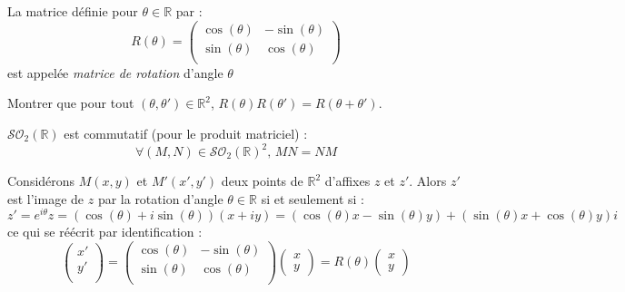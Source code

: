 \documentclass[french,11pt,twoside]{VcCours}
\begin{document}
\newpage

\begin{Notation}{} La matrice définie pour $\theta \in \mathbb{R}$ par :
$$ R(\theta) =\begin{pmatrix}
\cos(\theta) & - \sin(\theta) \\
\sin(\theta) & \cos(\theta) \\
\end{pmatrix}$$
est appelée \emph{matrice de rotation} d'angle $\theta$
\end{Notation}

\begin{ApplicationDirecte}{} Montrer que pour tout $(\theta, \theta') \in \mathbb{R}^2$, $R(\theta) R(\theta') = R(\theta + \theta')$.
\end{ApplicationDirecte}

\begin{Proposition}{} $\mathcal{SO}_2(\mathbb{R})$ est commutatif (pour le produit matriciel) : 
$$ \forall (M,N) \in \mathcal{SO}_2(\mathbb{R})^2, \,  MN=NM$$
\end{Proposition}

\begin{Demonstration}{}
\vspace{3cm}
\end{Demonstration}

\begin{Remarque}{} Considérons $M(x,y)$ et $M'(x',y')$ deux points de $\mathbb{R}^2$ d'affixes $z$ et $z'$. Alors $z'$ est l'image de $z$ par la rotation d'angle $\theta \in \mathbb{R}$ si et seulement si :
$$z'= e^{i \theta } z = (\cos(\theta) + i \sin(\theta))(x+iy) = (\cos(\theta) x- \sin(\theta)y) + (\sin(\theta)x+ \cos(\theta)y)i$$
ce qui se réécrit par identification :
$$ \begin{pmatrix}
x'\\
y' \\
\end{pmatrix} = \begin{pmatrix}
\cos(\theta) & - \sin(\theta) \\
\sin(\theta) & \cos(\theta) \\
\end{pmatrix} \begin{pmatrix}
x \\
y
\end{pmatrix} = R(\theta) \begin{pmatrix}
x \\
y
\end{pmatrix}$$
\end{Remarque}
\end{document}
